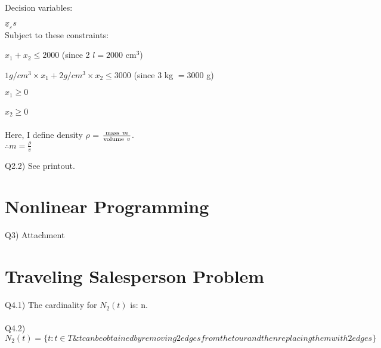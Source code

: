 \documentclass[letter,12pt]{article}
\begin{document}
Decision variables:

$\underline{x}_{\varepsilon} s$ \\

Subject to these constraints:

$x_{1} + x_{2} \leq 2000 $ (since 2 $l = 2000$ cm$^{3}$)

$1 g/cm^{3} \times x_{1} + 2 g/cm^{3} \times x_{2} \leq 3000 $ (since 3 kg $ = 3000$ g)

$x_{1} \geq 0$

$x_{2} \geq 0$
\ \\
\ \\
Here, I define density $\rho$ = $\frac{{\rm mass}\ m}{{\rm volume}\ v}$. \\

$\therefore m = \frac{\rho}{v}$


Q2.2) See printout.


\section{Nonlinear Programming}
\label{sec:nonlinearprogramming}

Q3) Attachment




\section{Traveling Salesperson Problem}
\label{sec:tspquestion}



Q4.1) The cardinality for $N_{2}(t)$ is: n. \\
\ \\
Q4.2) $N_{2}(t) = \{ t: t \in T \& t can be obtained by removing 2 edges from the tour and then replacing them with 2 edges \}$















{\linespread{1}


}
\end{document}
